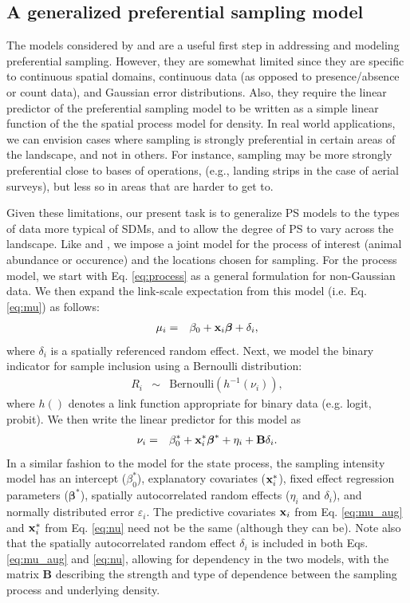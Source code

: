 \documentclass[times,mee,doublespace,]{besauth2}
\begin{document}
\subsection{A generalized preferential sampling model}

The models considered by \citet{DiggleEtAl2010} and \citet{PatiEtAl2011} are a useful first step in addressing and modeling preferential sampling.  However, they are somewhat limited since they are specific to continuous spatial domains, continuous data (as opposed to presence/absence or count data), and Gaussian error distributions.  Also, they require the linear predictor of the preferential sampling model to be written as a simple linear function of the the spatial process model for density.  In real world applications, we can envision cases where sampling is strongly preferential in certain areas of the landscape, and not in others.  For instance, sampling may be more strongly preferential close to bases of operations, (e.g., landing strips in the case of aerial surveys), but less so in areas that are harder to get to.

Given these limitations, our present task is to generalize PS models to the types of data more typical of SDMs, and to allow the degree of PS to vary across the landscape.  Like \citet{DiggleEtAl2010} and \citet{PatiEtAl2011}, we impose a joint model for the process of interest (animal abundance or occurence) and the locations chosen for sampling. For the process model, we start with Eq. \ref{eq:process} as a general formulation for non-Gaussian data.  We then expand the link-scale expectation from this model
(i.e. Eq. \ref{eq:mu}) as follows:
\begin{eqnarray}
  \mu_i & = & \beta_0 + {\bf x}_i \boldsymbol{\beta}+\delta_i,
\label{eq:mu_aug}
\end{eqnarray}
where $\delta_i$ is a spatially referenced random effect.  Next, we model the binary indicator for sample inclusion using a Bernoulli distribution:
\begin{eqnarray}
 \label{eq:R}
  R_i & \sim & \text{Bernoulli}(h^{-1}(\nu_i)),
\end{eqnarray}
where $h()$ denotes a link function appropriate for binary data (e.g. logit, probit).  We then write the linear predictor for this model as
\begin{eqnarray}
  \label{eq:nu}
  \nu_i & = & \beta_0^* + {\bf x}_i^* \boldsymbol{\beta}^*+\eta_i+{\bf B} \delta_i.
\label{eq:nu}
\end{eqnarray}
 In a similar fashion to the model for the state process, the sampling intensity model has an intercept ($\beta_0^*$), explanatory covariates (${\bf x}_i^*$), fixed effect regression parameters ($\boldsymbol{\beta}^*$), spatially autocorrelated random effects ($\eta_i$ and $\delta_i$), and normally distributed error $\varepsilon_i$.  The predictive covariates ${\bf x}_i$ from Eq. \ref{eq:mu_aug} and ${\bf x}_i^*$ from Eq. \ref{eq:nu} need not be the same (although they can be).  Note also that the  spatially autocorrelated random effect $\delta_i$ is included in both Eqs. \ref{eq:mu_aug} and \ref{eq:nu}, allowing for dependency in the two models, with the matrix {\bf B} describing the strength and type of dependence between the sampling process and underlying density.
\end{document}
